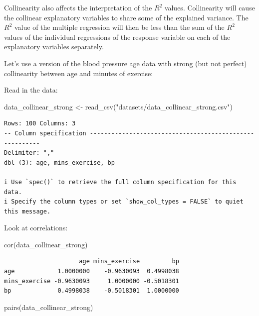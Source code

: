 \documentclass[
  letterpaper,
  8pt,
  a4paper]{book}
\newenvironment{Shaded}{\begin{snugshade}}{\end{snugshade}}
\newcommand{\FunctionTok}[1]{\textcolor[rgb]{0.28,0.35,0.67}{#1}}
\newcommand{\NormalTok}[1]{\textcolor[rgb]{0.00,0.23,0.31}{#1}}
\newcommand{\OtherTok}[1]{\textcolor[rgb]{0.00,0.23,0.31}{#1}}
\newcommand{\StringTok}[1]{\textcolor[rgb]{0.13,0.47,0.30}{#1}}
\begin{document}
Collinearity also affects the interpretation of the \(R^2\) values.
Collinearity will cause the collinear explanatory variables to share
some of the explained variance. The \(R^2\) value of the multiple
regression will then be less than the sum of the \(R^2\) values of the
individual regressions of the response variable on each of the
explanatory variables separately.

Let's use a version of the blood pressure age data with strong (but not
perfect) collinearity between age and minutes of exercise:

Read in the data:

\begin{Shaded}
\begin{Highlighting}[]
\NormalTok{data\_collinear\_strong }\OtherTok{\textless{}{-}} \FunctionTok{read\_csv}\NormalTok{(}\StringTok{"datasets/data\_collinear\_strong.csv"}\NormalTok{)}
\end{Highlighting}
\end{Shaded}

\begin{verbatim}
Rows: 100 Columns: 3
-- Column specification --------------------------------------------------------
Delimiter: ","
dbl (3): age, mins_exercise, bp

i Use `spec()` to retrieve the full column specification for this data.
i Specify the column types or set `show_col_types = FALSE` to quiet this message.
\end{verbatim}

Look at correlations:

\begin{Shaded}
\begin{Highlighting}[]
\FunctionTok{cor}\NormalTok{(data\_collinear\_strong)}
\end{Highlighting}
\end{Shaded}

\begin{verbatim}
                     age mins_exercise         bp
age            1.0000000    -0.9630093  0.4998038
mins_exercise -0.9630093     1.0000000 -0.5018301
bp             0.4998038    -0.5018301  1.0000000
\end{verbatim}

\begin{Shaded}
\begin{Highlighting}[]
\FunctionTok{pairs}\NormalTok{(data\_collinear\_strong)}
\end{Highlighting}
\end{Shaded}
\end{document}
